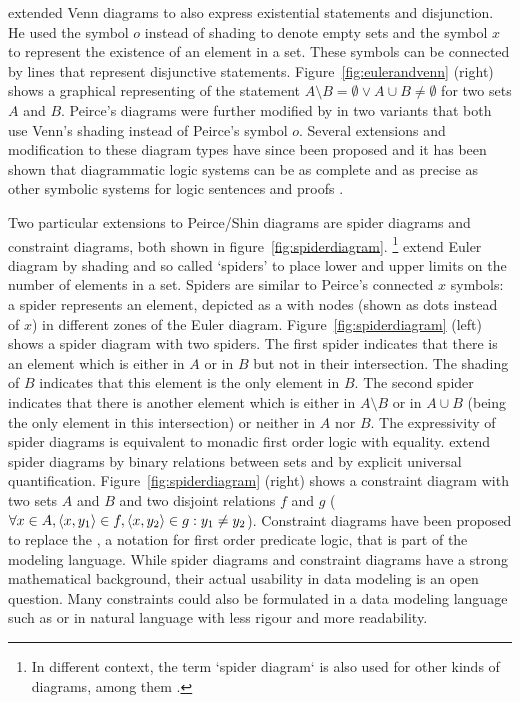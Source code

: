 \textcite{Peirce1933} extended Venn diagrams to also express existential
statements and disjunction. He used the symbol $o$ instead of shading to denote
empty sets and the symbol $x$ to represent the existence of an element in a
set. These symbols can be connected by lines that represent disjunctive
statements. Figure~\ref{fig:eulerandvenn} (right) shows a graphical
representing of the statement $A \setminus B = \emptyset \lor A \cup B \neq
\emptyset$ for two sets $A$ and $B$.  Peirce's diagrams were further modified
by \textcite{Shin1995} in two variants that both use Venn's shading instead of
Peirce's symbol $o$. Several extensions and modification to these diagram types
have since been proposed \cite{Howse2008,Dau2009b} and it has been shown that
diagrammatic logic systems can be as complete and as precise as other symbolic
systems for logic sentences and proofs \cite{Hammer1994}. 

Two particular extensions to Peirce/Shin diagrams are spider diagrams and
constraint diagrams, both shown in figure~\ref{fig:spiderdiagram}.
 \cite{Gil1999a}\footnote{In different
context, the term `spider diagram` is also used for other kinds of diagrams,
among them .} extend Euler diagram by shading and so called
`spiders' to place lower and upper limits on the number of elements in a set.
Spiders are similar to Peirce's connected $x$ symbols: a spider represents an
element, depicted as a  with nodes (shown as dots instead of $x$) in
different zones of the Euler diagram.  Figure~\ref{fig:spiderdiagram} (left)
shows a spider diagram with two spiders.  The first spider indicates that there
is an element which is either in $A$ or in $B$ but not in their intersection.
The shading of $B$ indicates that this element is the only element in $B$. The
second spider indicates that there is another element which is either in $A
\setminus B$ or in $A \cup B$ (being the only element in this intersection) or
neither in $A$ nor $B$. The expressivity of spider diagrams is equivalent to
monadic first order logic with equality.   \cite{Gil1999b,Gil2001} extend spider diagrams by binary relations
between sets and by explicit universal quantification.
Figure~\ref{fig:spiderdiagram} (right) shows a constraint diagram with two sets
$A$ and $B$ and two disjoint relations $f$ and $g$ ($\forall x \in A,
\langle x,y_1 \rangle \in f, \langle x,y_2 \rangle \in g: y_1 \neq y_2$).  Constraint diagrams
have been proposed to replace the , a
notation for first order predicate logic, that is part of the 
modeling language. While spider diagrams and constraint diagrams have a strong
mathematical background, their actual usability in data modeling is an open
question. Many constraints could also be formulated in a data modeling language
such as  or in natural language with less rigour and more
readability.

